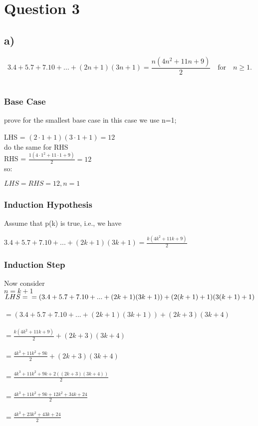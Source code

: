 \documentclass[english,10pt,a4paper]{report}
\begin{document}
\section*{Question 3}

\subsection*{a)}
\[
3.4 + 5.7 + 7.10 + ... + (2n+1)(3n+1) = \frac{n(4n^2 + 11n + 9)}{2} \quad \text{for} \quad n \geq 1.
\]\\

\subsubsection{Base Case}
prove for the smallest base case in this case we use n=1;

LHS = $(2 \cdot 1 + 1)(3 \cdot 1 +1) = 12$\\

do the same for RHS\\
RHS = $\frac{1(4\cdot 1 ^{2} + 11 \cdot 1 + 9 )}{2} = 12$\\

so: 

$LHS = RHS = 12,  n=1$
\subsubsection{Induction Hypothesis}

Assume that p(k) is true, i.e., we have

$3.4 + 5.7 + 7.10 + ... + (2k+1)(3k+1) = \frac{k(4k^2 + 11k + 9)}{2}$


\subsubsection{Induction Step}

Now consider\\
 $n = k + 1$ \\
  
 $LHS= \\= (3.4 + 5.7 + 7.10 + ... + (2k+1)(3k+1))+(2(k+1)+1)(3(k+1)+1)$ \\\\
 $= (3.4 + 5.7 + 7.10 + ... + (2k+1)(3k+1))+(2k+3)(3k+4)$\\\\
 $= \frac{k(4k^2 + 11k + 9)}{2} + (2k+3)(3k+4)$\\\\
 $=\frac{4k^{3} + 11k^{2} + 9k}{2} + (2k+3)(3k+4)$\\\\
$=\frac{4k^{3} + 11k^{2} + 9k + 2((2k+3)(3k+4))}{2}$\\\\
$=\frac{4k^{3} + 11k^{2} + 9k +12 k^{2} + 34 k + 24}{2}$\\\\
$=\frac{4 k^3+ 23 k^2+43 k + 24 }{2}$\\\\
\end{document}
